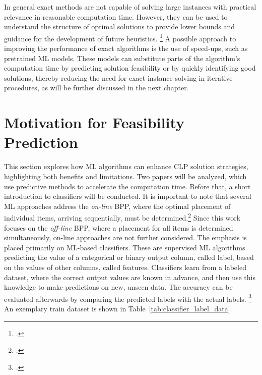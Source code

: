 \parbreak

In general exact methods are not capable of solving large instances with practical relevance
in reasonable computation time. However, they can be used to understand the structure
of optimal solutions to provide lower bounds and guidance for the development of future
heuristics. \footcite[cf.][p. 2]{tamke_branch-and-cut_2024} A possible approach to improving
the performance of exact algorithms is the use of speed-ups, such as pretrained \gls{ML} models.
These models can substitute parts of the algorithm's computation time by predicting solution
feasibility or by quickly identifying good solutions, thereby reducing the need for exact instance
solving in iterative procedures, as will be further discussed in the next chapter.

\section{Motivation for Feasibility Prediction}
\label{sec:motivation_feasibility_prediction}
This section explores how \gls{ML} algorithms can enhance \gls{CLP} solution strategies,
highlighting both benefits and limitations. Two papers will be
analyzed, which use predictive methods to accelerate the computation time. Before that,
a short introduction to classifiers will be conducted. It is important to note that
several \gls{ML} approaches address the \textit{on-line} \gls{BPP}, where the optimal placement
of individual items, arriving sequentially, must be determined.\footcite[cf.][p. 1]{ali_-line_2022}
Since this work focuses on the \textit{off-line} \gls{BPP}, where a placement for all items is determined
simultaneously, on-line approaches are not further considered. The emphasis is placed primarily
on \gls{ML}-based classifiers. These are supervised \gls{ML} algorithms predicting the
value of a categorical or binary output column, called label, based on the
values of other columns, called features. Classifiers learn from a labeled dataset,
where the correct output values are known in advance, and then use this knowledge to
make predictions on new, unseen data. The accuracy can be evaluated afterwards by comparing
the predicted labels with the actual labels. \footcite[cf.][]{kotsiantis_supervised_2007}
An exemplary train dataset is shown in Table~\ref{tab:classifier_label_data}.



